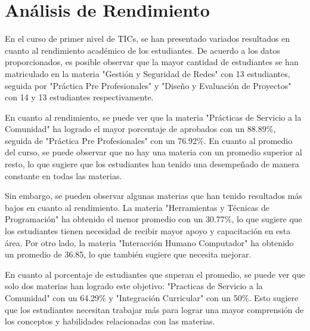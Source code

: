 \vspace{1cm}
\section{Análisis de Rendimiento}
En el curso de primer nivel de TICs, se han presentado variados resultados en cuanto al rendimiento académico de los estudiantes. De acuerdo a los datos proporcionados, es posible observar que la mayor cantidad de estudiantes se han matriculado en la materia "Gestión y Seguridad de Redes" con 13 estudiantes, seguida por "Práctica Pre Profesionales" y "Diseño y Evaluación de Proyectos" con 14 y 13 estudiantes respectivamente. 

En cuanto al rendimiento, se puede ver que la materia "Prácticas de Servicio a la Comunidad" ha logrado el mayor porcentaje de aprobados con un 88.89\%, seguida de "Práctica Pre Profesionales" con un 76.92\%. En cuanto al promedio del curso, se puede observar que no hay una materia con un promedio superior al resto, lo que sugiere que los estudiantes han tenido una desempeñado de manera constante en todas las materias.

Sin embargo, se pueden observar algunas materias que han tenido resultados más bajos en cuanto al rendimiento. La materia "Herramientas y Técnicas de Programación" ha obtenido el menor promedio con un 30.77\%, lo que sugiere que los estudiantes tienen necesidad de recibir mayor apoyo y capacitación en esta área. Por otro lado, la materia "Interacción Humano Computador" ha obtenido un promedio de 36.85, lo que también sugiere que necesita mejorar.

En cuanto al porcentaje de estudiantes que superan el promedio, se puede ver que solo dos materias han logrado este objetivo: "Practicas de Servicio a la Comunidad" con un 64.29\% y "Integración Curricular" con un 50\%. Esto sugiere que los estudiantes necesitan trabajar más para lograr una mayor comprensión de los conceptos y habilidades relacionadas con las materias.

